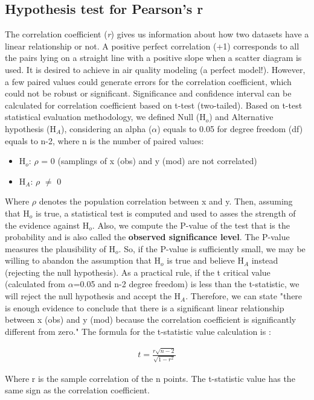   \subsection{Hypothesis test for Pearson's r}
 The correlation coefficient (\textit{r}) gives us information about how two datasets have a linear relationship or not.
  A positive perfect correlation (+1) corresponds to all the pairs lying on a straight line with a positive slope when a scatter diagram is used.
  It is desired to achieve in air quality modeling (a perfect model!). 
  However, a few paired values could generate errors for the correlation coefficient, which could not be robust or significant.
  Significance and confidence interval can be calculated for correlation coefficient based on t-test (two-tailed).
   Based on \citet{Navidi2019} t-test statistical evaluation methodology, we defined Null (H$_o$) and Alternative hypothesis (H$_A$), considering an alpha ($\alpha$) equals to 0.05 for degree freedom (df) equals to n-2, where n is the number of paired values:
  \begin{itemize}
  	\item H$_o$: $\rho$ = 0 (samplings of x (obs) and y (mod) are not correlated)
  	\item H$_A$: $\rho$ $\neq$ 0
  \end{itemize}
  Where $\rho$ denotes the population correlation between x and y.
  Then, assuming that H$_o$ is true, a statistical test is computed and used to asses the strength of the evidence against H$_o$.
  Also, we compute the P-value of the test that is the probability and is also called the \textbf{observed significance level}.
  The P-value measures the plausibility of H$_o$.
  So, if the P-value is sufficiently small, we may be willing to abandon the assumption that H$_o$ is true and believe H$_A$ instead (rejecting the null hypothesis).
  As a practical rule, if the t critical value (calculated from $\alpha$=0.05 and n-2 degree freedom) is less than the t-statistic, we will reject the null hypothesis and accept the H$_A$.
  Therefore, we can state "there is enough evidence to conclude that there is a significant linear relationship between x (obs) and y (mod) because the correlation coefficient is significantly different from zero."
  The formula for the t-statistic value calculation is \citep{Navidi2019}:
  
  \begin{align}
  	t = \frac{r\sqrt{n-2}}{\sqrt{1-r^2}}
  \end{align}
  
  Where r is the sample correlation of the n points. 
  The t-statistic value has the same sign as the correlation coefficient.






  
  
  